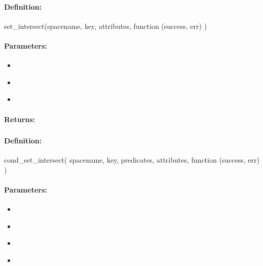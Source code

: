 \paragraph{Definition:}
\begin{javascriptcode}
set_intersect(spacename, key, attributes, function (success, err) {})
\end{javascriptcode}
\paragraph{Parameters:}
\begin{itemize}[noitemsep]
\item {}\\

\item {}\\

\item {}\\

\end{itemize}

\paragraph{Returns:}


\pagebreak
\subsubsection{}
\label{api:nodejs:cond_set_intersect}


\paragraph{Definition:}
\begin{javascriptcode}
cond_set_intersect(
        spacename, key, predicates, attributes, function (success, err) {})
\end{javascriptcode}
\paragraph{Parameters:}
\begin{itemize}[noitemsep]
\item {}\\

\item {}\\

\item {}\\

\item {}\\

\end{itemize}

